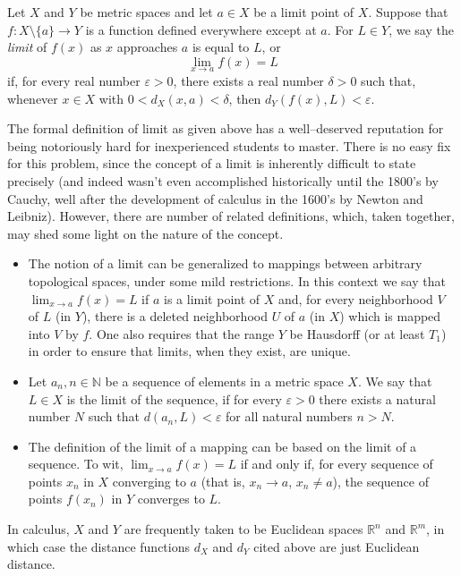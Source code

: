 \documentclass[12pt]{article}
\begin{document}
Let $X$ and $Y$ be metric spaces and let $a \in X$ be a limit point of $X$. Suppose that $f\colon X \setminus \{a\} \to Y$ is a function defined everywhere except at
$a$. For $L \in Y$, we say the \emph{limit} of $f(x)$ as $x$
approaches $a$ is equal to $L$, or
$$
\lim_{x \to a} f(x) = L
$$
if, for every real number $\varepsilon > 0$, there exists a real
number $\delta > 0$ such that, whenever $x \in X$ with $0 < d_X(x,a)
< \delta$, then $d_Y(f(x), L) < \varepsilon$.

The formal definition of limit as given above has a well--deserved
reputation for being notoriously hard for inexperienced students to
master. There is no easy fix for this problem, since the concept of a
limit is inherently difficult to state precisely (and indeed wasn't
even accomplished historically until the 1800's by Cauchy, well after
the development of calculus in the 1600's by Newton and Leibniz).
However, there are number of related definitions, which, taken
together, may shed some light on the nature of the concept.

\begin{itemize}
\item The notion of a limit can be generalized to mappings between arbitrary 
topological spaces, under some mild restrictions.  In this context we say that
$\lim_{x \to a} f(x) = L$ if $a$ is a limit point of $X$ and, for every
neighborhood $V$ of $L$ (in $Y$), there is a deleted neighborhood
$U$ of $a$ (in $X$) which is mapped into $V$ by $f$. One also requires that the range $Y$ be Hausdorff (or at least $T_1$) in order to ensure that limits, when they exist, are unique.
\item Let $a_n, n\in\mathbb{N}$ be a sequence of elements in a metric
  space $X$.  We say that $L\in X$ is the limit of the sequence, if
  for every $\varepsilon>0$ there exists a natural number $N$ such
  that $d(a_n,L)< \varepsilon$ for all natural numbers $n> N$.
\item The definition of the limit of a mapping can be based on the
  limit of a sequence.  To wit, $\lim_{x \to a} f(x) = L$ if and only
  if, for every sequence of points $x_n$ in $X$ converging to $a$
  (that is, $x_n \to a$, $x_n \neq a$), the sequence of points
  $f(x_n)$ in $Y$ converges to $L$.
\end{itemize}
In calculus, $X$ and $Y$ are frequently taken to be Euclidean spaces
$\mathbb{R}^n$ and $\mathbb{R}^m$, in which case the distance
functions $d_X$ and $d_Y$ cited above are just Euclidean distance.
\end{document}
